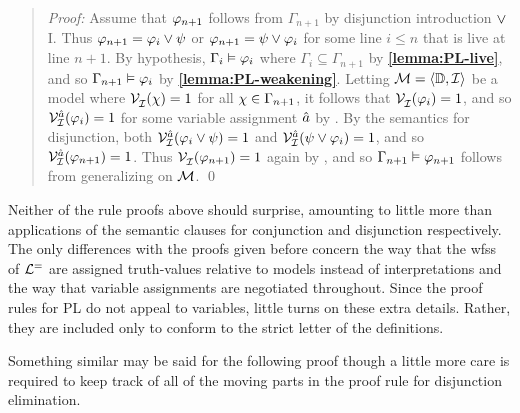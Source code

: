 \begin{quote} 
  \textit{Proof:} Assume that $\varphi_{n+1}$ follows from $\Gamma_{n+1}$ by disjunction introduction $\vee$I.
  Thus $\varphi_{n+1}=\varphi_i\vee\psi$ or $\varphi_{n+1}=\psi\vee\varphi_i$ for some line $i\leq n$ that is live at line $n+1$.
  By hypothesis, $\Gamma_i\vDash \varphi_i$ where $\Gamma_i\subseteq \Gamma_{n+1}$ by \textbf{\ref{lemma:PL-live}}, and so $\Gamma_{n+1} \vDash \varphi_i$ by \textbf{\ref{lemma:PL-weakening}}.
  Letting $\mathcal{M}=\langle\mathbb{D},\mathcal{I}\rangle$ be a model where $\mathcal{V}_{\mathcal{I}}^{}(\chi) = 1$ for all $\chi \in \Gamma_{n+1}$, it follows that $\mathcal{V}_{\mathcal{I}}^{}(\varphi_i) = 1$, and so $\mathcal{V}_{\mathcal{I}}^{\hat{a}}(\varphi_i)=1$ for some variable assignment $\hat{a}$ by .
  By the semantics for disjunction, both $\mathcal{V}_{\mathcal{I}}^{\hat{a}}(\varphi_{i}\vee\psi)=1$ and $\mathcal{V}_{\mathcal{I}}^{\hat{a}}(\psi\vee\varphi_{i})=1$, and so $\mathcal{V}_{\mathcal{I}}^{\hat{a}}(\varphi_{n+1})=1$.
  Thus $\mathcal{V}_{\mathcal{I}}^{}(\varphi_{n+1})=1$ again by , and so $\Gamma_{n+1} \vDash \varphi_{n+1}$ follows from generalizing on $\mathcal{M}$.
  \qed
\end{quote}




Neither of the rule proofs above should surprise, amounting to little more than applications of the semantic clauses for conjunction and disjunction respectively.
The only differences with the proofs given before concern the way that the wfss of $\mathcal{L}^{=}$ are assigned truth-values relative to models instead of interpretations and the way that variable assignments are negotiated throughout.
Since the proof rules for PL do not appeal to variables, little turns on these extra details.
Rather, they are included only to conform to the strict letter of the definitions.

Something similar may be said for the following proof though a little more care is required to keep track of all of the moving parts in the proof rule for disjunction elimination.


